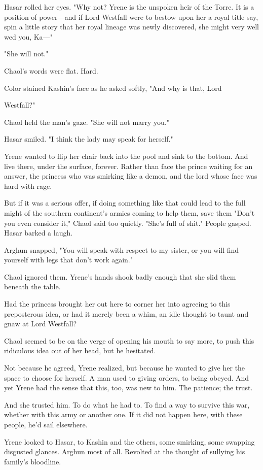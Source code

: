 Hasar rolled her eyes. "Why not? Yrene is the unspoken heir of the Torre. It is a position of power---and if Lord Westfall were to bestow upon her a royal title  say, spin a little story that her royal lineage was newly discovered, she might very well wed you, Ka---"

"She will not."

Chaol's words were flat. Hard.

Color stained Kashin's face as he asked softly, "And why is that, Lord

Westfall?"

Chaol held the man's gaze. "She will not marry you."

Hasar smiled. "I think the lady may speak for herself."

Yrene wanted to flip her chair back into the pool and sink to the bottom. And live there, under the surface, forever. Rather than face the prince waiting for an answer, the princess who was smirking like a demon, and the lord whose face was hard with rage.

But if it was a serious offer, if doing something like that could lead to the full might of the southern continent's armies coming to help them, save them  "Don't you even consider it," Chaol said too quietly. "She's full of shit." People gasped. Hasar barked a laugh.

Arghun snapped, "You will speak with respect to my sister, or you will find yourself with legs that don't work again."

Chaol ignored them. Yrene's hands shook badly enough that she slid them beneath the table.

Had the princess brought her out here to corner her into agreeing to this preposterous idea, or had it merely been a whim, an idle thought to taunt and gnaw at Lord Westfall?

Chaol seemed to be on the verge of opening his mouth to say more, to push this ridiculous idea out of her head, but he hesitated.

Not because he agreed, Yrene realized, but because he wanted to give her the space to choose for herself. A man used to giving orders, to being obeyed. And yet Yrene had the sense that this, too, was new to him. The patience; the trust.

And she trusted him. To do what he had to. To find a way to survive this war, whether with this army or another one. If it did not happen here, with these people, he'd sail elsewhere.

Yrene looked to Hasar, to Kashin and the others, some smirking, some swapping disgusted glances. Arghun most of all. Revolted at the thought of sullying his family's bloodline.

